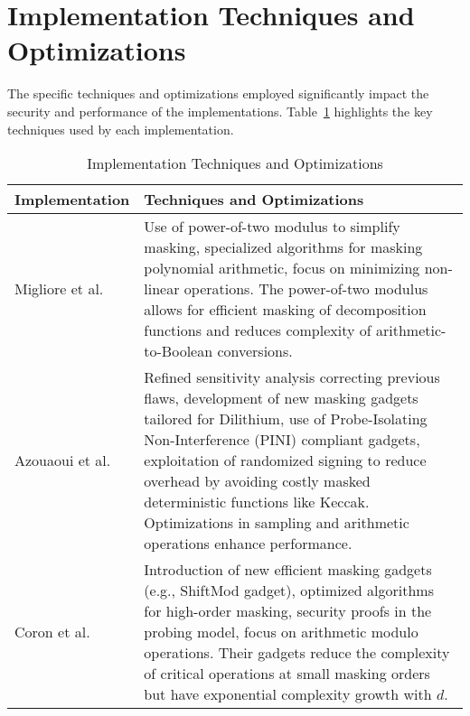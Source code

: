 \section{Implementation Techniques and Optimizations}

The specific techniques and optimizations employed significantly impact the security and performance of the implementations. Table~\ref{tab:implementation_techniques} highlights the key techniques used by each implementation.

\begin{table}[h]
    \centering
    \renewcommand{\arraystretch}{1.2}
    \caption{Implementation Techniques and Optimizations}
    \begin{tabular}{l | p{11cm}}
        \toprule
        \textbf{Implementation}           & \textbf{Techniques and Optimizations}                                                                                                                                                                                                                                                                                                                                              \\
        \midrule
        Migliore et al.~\cite{Migliore19} & Use of power-of-two modulus to simplify masking, specialized algorithms for masking polynomial arithmetic, focus on minimizing non-linear operations. The power-of-two modulus allows for efficient masking of decomposition functions and reduces complexity of arithmetic-to-Boolean conversions.                                                                                \\
        \midrule
        Azouaoui et al.~\cite{Azouaoui22} & Refined sensitivity analysis correcting previous flaws, development of new masking gadgets tailored for Dilithium, use of Probe-Isolating Non-Interference (PINI) compliant gadgets, exploitation of randomized signing to reduce overhead by avoiding costly masked deterministic functions like Keccak. Optimizations in sampling and arithmetic operations enhance performance. \\
        \midrule
        Coron et al.~\cite{Coron23}       & Introduction of new efficient masking gadgets (e.g., ShiftMod gadget), optimized algorithms for high-order masking, security proofs in the probing model, focus on arithmetic modulo operations. Their gadgets reduce the complexity of critical operations at small masking orders but have exponential complexity growth with $d$.                                               \\
        \bottomrule
    \end{tabular}
    \label{tab:implementation_techniques}
\end{table}

